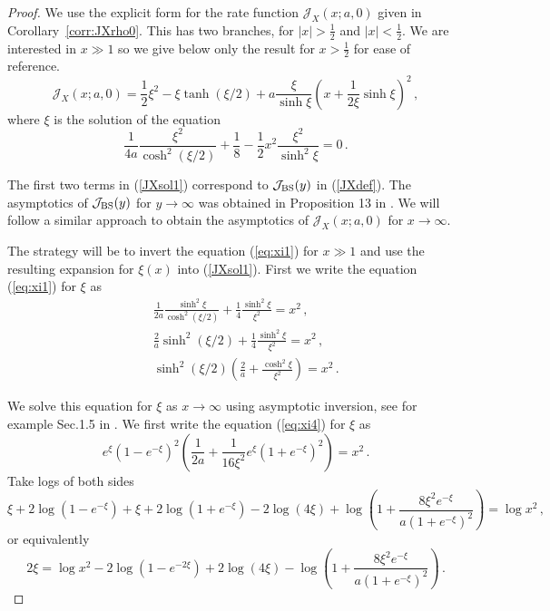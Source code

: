 \documentclass[11pt]{article}
\numberwithin{equation}{section}
\theoremstyle{plain}
\begin{document}
\begin{proof}
We use the explicit form for the rate function $\mathcal{J}_X(x;a,0)$ given in
Corollary~\ref{corr:JXrho0}. This has two branches, for $|x|>\frac12$ and
$|x|<\frac12$. We are interested in $x\gg 1$ so we give below only
the result for $x>\frac12$ for ease of reference.
\begin{equation}\label{JXsol1}
\mathcal{J}_X(x;a,0) = \frac12\xi^2 - \xi \tanh(\xi/2) + a \frac{\xi}{\sinh\xi}
\left( x + \frac{1}{2\xi} \sinh\xi \right)^2\,,
\end{equation}
where $\xi$ is the solution of the equation
\begin{equation}\label{eq:xi1}
\frac{1}{4a} \frac{\xi^2}{\cosh^2(\xi/2)} + \frac18 - \frac12 x^2 \frac{\xi^2}
{\sinh^2 \xi} = 0\,.
\end{equation}

The first two terms in (\ref{JXsol1}) correspond to $\mathcal{J}_{\rm BS}(y)$ in
(\ref{JXdef}). The asymptotics of $\mathcal{J}_{\rm BS}(y)$ for $y\to \infty$
was obtained in Proposition 13 in \cite{PZSIFIN}. We will follow a similar
approach to obtain the asymptotics of $\mathcal{J}_{X}(x;a,0)$ for $x\to \infty$.

The strategy will be to invert the equation (\ref{eq:xi1}) for $x \gg 1$ and
use the resulting expansion for $\xi(x)$ into (\ref{JXsol1}).
First we write the equation (\ref{eq:xi1}) for $\xi$ as
\begin{eqnarray}\label{eq:xi2}
&& \frac{1}{2a} \frac{\sinh^2\xi}{\cosh^2(\xi/2)} + \frac14 \frac{\sinh^2\xi}{\xi^2}
= x^2\,, \\
\label{eq:xi3}
&& \frac{2}{a} \sinh^2(\xi/2) + \frac14 \frac{\sinh^2\xi}{\xi^2}
= x^2\,, \\
\label{eq:xi4}
&& \sinh^2(\xi/2)\left( \frac{2}{a} + \frac{\cosh^2\xi}{\xi^2} \right)
= x^2 \,.
\end{eqnarray}

We solve this equation for $\xi$ as $x\to \infty$ using asymptotic inversion,
see for example Sec.1.5 in \cite{Olver}. 
We first write the equation (\ref{eq:xi4}) for $\xi$ as 
\begin{equation}\label{eq:xi5}
e^\xi \left(1 - e^{-\xi}\right)^2 \left( \frac{1}{2a} + \frac{1}{16\xi^2}
e^\xi \left(1 + e^{-\xi}\right)^2 \right) = x^2\,.
\end{equation}
Take logs of both sides
\begin{equation*}
\xi + 2 \log(1-e^{-\xi}) + \xi + 2 \log(1+e^{-\xi}) - 2 \log(4\xi)
+ \log\left( 1 + \frac{8\xi^2 e^{-\xi}}{a(1+e^{-\xi})^2} \right) = \log x^2\,,
\nonumber
\end{equation*}
or equivalently
\begin{equation*}
2\xi =  \log x^2 - 2 \log\left(1-e^{-2\xi}\right) + 2 \log(4\xi) -
\log\left( 1 + \frac{8\xi^2 e^{-\xi}}{a(1+e^{-\xi})^2}\right)\,.
\end{equation*}


\end{proof}
\end{document}
